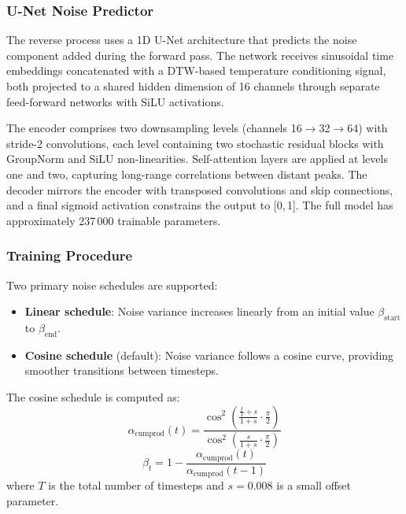 \subsubsection{U-Net Noise Predictor}

The reverse process uses a 1D U-Net architecture that predicts the noise component added during the forward pass.
The network receives sinusoidal time embeddings concatenated with a DTW-based temperature conditioning signal, both projected to a shared hidden dimension of 16 channels through separate feed-forward networks with SiLU activations.

The encoder comprises two downsampling levels (channels 16$\to$32$\to$64) with stride-2 convolutions, each level containing two stochastic residual blocks with GroupNorm and SiLU non-linearities.
Self-attention layers are applied at levels one and two, capturing long-range correlations between distant peaks.
The decoder mirrors the encoder with transposed convolutions and skip connections, and a final sigmoid activation constrains the output to [0,\,1].
The full model has approximately 237\,000 trainable parameters.

\subsubsection{Training Procedure}


Two primary noise schedules are supported:
\begin{itemize}
    \item \textbf{Linear schedule}: Noise variance increases linearly from an initial value \( \beta_{\text{start}} \) to \( \beta_{\text{end}} \).
    \item \textbf{Cosine schedule} (default): Noise variance follows a cosine curve, providing smoother transitions between timesteps.
\end{itemize}

The cosine schedule is computed as:
\begin{equation}
\alpha_{\text{cumprod}}(t) = \frac{\cos^2\left(\frac{\frac{t}{T} + s}{1 + s} \cdot \frac{\pi}{2}\right)}{\cos^2\left(\frac{s}{1 + s} \cdot \frac{\pi}{2}\right)}
\end{equation}
\begin{equation}
\beta_t = 1 - \frac{\alpha_{\text{cumprod}}(t)}{\alpha_{\text{cumprod}}(t-1)}
\end{equation}
where \( T \) is the total number of timesteps and \( s = 0.008 \) is a small offset parameter.



